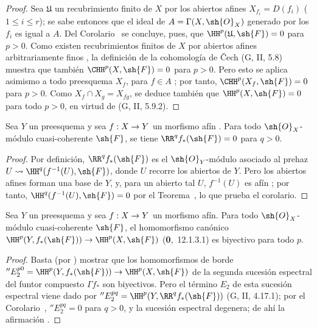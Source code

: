 \documentclass[oneside]{amsart}
\makeatletter
\renewcommand{\leq}{\leqslant}
\newcommand{\ega@arrow}[2]{\mathchoice{#1}{#2}{#2}{#2}}
\renewcommand{\to}{\ega@arrow{\longrightarrow}{\rightarrow}}
\let\EGAOriginalLabel\label
\renewcommand{\label}[1]{\phantomsection\EGAOriginalLabel{#1}}
\makeatother
\begin{document}
\begin{proof}
Sea $\mathfrak{U}$ un recubrimiento finito de $X$ por los abiertos afines $X_{f_i}=D(f_i)$ ($1\leq i\leq r$); se sabe entonces que el ideal de $A=\Gamma(X,\sh{O}_X)$ generado por los $f_i$ es igual a $A$.
Del Corolario~ se concluye, pues, que $\HH^p(\mathfrak{U},\sh{F})=0$ para $p>0$.
Como existen recubrimientos finitos de $X$ por abiertos afines arbitrariamente finos , la definición de la cohomología de \v Cech (G, II, 5.8) muestra que también $\CHH^p(X,\sh{F})=0$ para $p>0$.
Pero esto se aplica asimismo a todo preesquema $X_f$, para $f\in A$ ; por tanto, $\CHH^p(X_f,\sh{F})=0$ para $p>0$.
Como $X_f\cap X_g=X_{fg}$, se deduce también que $\HH^p(X,\sh{F})=0$ para todo $p>0$, en virtud de (G, II, 5.9.2).
\end{proof}

\begin{corollary}[1.3.2]
\label{III.1.3.2}
Sea $Y$ un preesquema y sea $f:X\to Y$ un morfismo afín \textup{}.
Para todo $\sh{O}_X$-módulo cuasi-coherente $\sh{F}$, se tiene $\RR^q f_*(\sh{F})=0$ para $q>0$.
\end{corollary}

\begin{proof}
Por definición, $\RR^q f_*(\sh{F})$ es el $\sh{O}_Y$-módulo asociado al prehaz $U\leadsto\HH^q(f^{-1}(U),\sh{F})$, donde $U$ recorre los abiertos de $Y$.
Pero los abiertos afines forman una base de $Y$, y, para un abierto tal $U$, $f^{-1}(U)$ es afín ; por tanto, $\HH^q(f^{-1}(U),\sh{F})=0$ por el Teorema~, lo que prueba el corolario.
\end{proof}

\begin{corollary}[1.3.3]
\label{III.1.3.3}
Sea $Y$ un preesquema y sea $f:X\to Y$ un morfismo afín.
Para todo $\sh{O}_X$-módulo cuasi-coherente $\sh{F}$, el homomorfismo canónico $\HH^p(Y,f_*(\sh{F}))\to\HH^p(X,\sh{F})$ \textup{(\textbf{0},~12.1.3.1)} es biyectivo para todo $p$.
\end{corollary}

\begin{proof}
Basta (por ) mostrar que los homomorfismos de borde $''E_2^{p0}=\HH^p(Y,f_*(\sh{F}))\to\HH^p(X,\sh{F})$ de la segunda sucesión espectral del funtor compuesto $\Gamma f_*$ son biyectivos.
Pero el término $E_2$ de esta sucesión espectral viene dado por $''E_2^{pq}=\HH^p(Y,\RR^q f_*(\sh{F}))$ (G, II, 4.17.1); por el Corolario~, $''E_2^{pq}=0$ para $q>0$, y la sucesión espectral degenera; de ahí la afirmación .
\end{proof}
\end{document}
